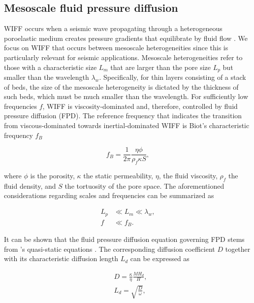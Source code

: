 \documentclass[draft]{agujournal2019}
\begin{document}
\subsection{Mesoscale fluid pressure diffusion}
WIFF occurs when a seismic wave propagating through a heterogeneous poroelastic medium creates
pressure gradients that equilibrate by fluid flow \cite{Muller2010}.
We focus on WIFF that occurs between mesoscale heterogeneities since this is particularly relevant for seismic applications. Mesoscale heterogeneities refer to those with a characteristic size $L_m$ that are larger than the pore size $L_p$ but smaller than the wavelength $\lambda_w$. Specifically, for thin layers consisting of a stack of beds, the size of the mesoscale heterogeneity is dictated by the thickness of such beds, which must be much smaller than the wavelength.
For sufficiently low frequencies $f$, WIFF is viscosity-dominated and, therefore, controlled by fluid pressure diffusion (FPD). The reference frequency that indicates the transition from viscous-dominated towards inertial-dominated WIFF is Biot's characteristic frequency $f_B$ \cite{Biot1956, Dutta1979}
\begin{linenomath*}
\begin{equation}\label{Eq.1}
f_B= \frac{1}{2 \pi} \frac{\eta \phi}{ \rho_f \kappa S },
\end{equation}
\end{linenomath*}
where $\phi$ is the porosity, $\kappa$  the static permeability, $\eta$, the fluid viscosity,  $\rho_f$ the fluid density, and $S$ the tortuosity of the pore space. The aforementioned considerations regarding scales and frequencies can be summarized as
\begin{linenomath*}
\begin{equation}\label{Eq.2}
\begin{split}
 L_p & \ll L_m \ll \lambda_w, \\
f & \ll f_B.
\end{split}
\end{equation}
\end{linenomath*}
It can be shown that the fluid pressure diffusion equation governing FPD stems from \citeauthor{Biot1941}'s \citeyear{Biot1941} quasi-static equations \cite{Dutta1979, Chandler1981, Norris1993}. The corresponding diffusion coefficient $D$  together with its characteristic diffusion length $L_d$ can be expressed as \cite{Norris1993}
\begin{linenomath*}
\begin{equation}\label{Eq.3}
\begin{split}
&D= \frac {\kappa} {\eta} \frac{M H_d}{H},\\
&L_d=\sqrt{\frac{D}{\omega}},
\end{split}
\end{equation}
\end{linenomath*}
\end{document}
